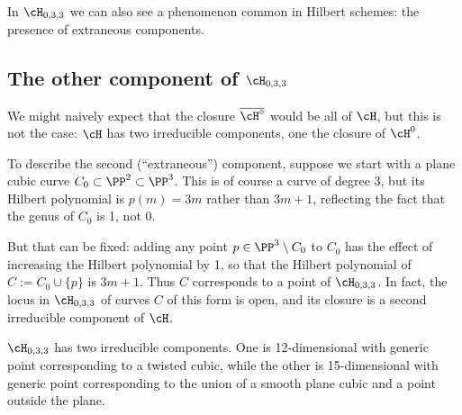 In $\cH_{0,3,3}$ we can also see a phenomenon common in Hilbert schemes: the presence of extraneous components.

\subsection{The other component of $\cH_{0,3,3}$}

We might naively expect that the closure $\overline{\cH^\circ}$ would be all of $\cH$, but this is not the case:  $\cH$ has two irreducible components, one the closure of $\cH^0$.

To describe the second (``extraneous'') component, suppose we start with a plane cubic curve $C_0 \subset \PP^2 \subset \PP^3$. This is of course a curve of degree 3, but its Hilbert polynomial is $p(m) = 3m$ rather than $3m+1$, reflecting the fact that the genus of $C_0$ is 1, not 0.

But that can be fixed: adding any point $p \in \PP^3 \setminus C_0$ to $C_0$ has the effect of increasing the Hilbert polynomial by 1, so that the Hilbert polynomial of $C := C_0\cup \{p\}$ is $3m+1$. Thus $C$  corresponds to a point of $\cH_{0,3,3}$. In fact, the locus in $\cH_{0,3,3}$ of curves $C$ of this form is open, and its closure is a second irreducible component of $\cH$. 


\begin{theorem}
$\cH_{0,3,3}$ has two irreducible components. One is 12-dimensional with generic point corresponding to  a twisted cubic,
while the other is 15-dimensional with generic point corresponding to the union of a smooth plane cubic and a point outside the plane.
\end{theorem}

